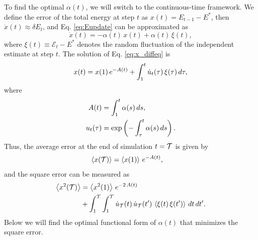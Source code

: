 \documentclass[reprint]{revtex4-1}
\begin{document}
To find the optimal $\alpha(t)$,
we will switch to the continuous-time framework.
%
We define the error of the total energy at step $t$ as
$x(t) = E_{t-1} - E^*$,
then $\dot x(t) \approx \delta E_t$,
and Eq. \eqref{eq:Eupdate} can be approximated as
%
\begin{equation}
  \dot x(t)
  =
  -\alpha(t) \, x(t) + \alpha(t) \, \xi(t)
  ,
  \label{eq:x_diffeq}
\end{equation}
%
where $\xi(t) \equiv \mathcal E_t - E^*$
denotes the random fluctuation of the independent estimate at step $t$.
%
The solution of Eq. \eqref{eq:x_diffeq} is
%
\begin{equation}
  x(t)
  =
  x(1) \, e^{ -A(t) }
  +
  \int_1^t \dot u_t(\tau) \, \xi(\tau) \, d\tau
  ,
  \notag
\end{equation}
%
where
\begin{align*}
  A(t)
  &=
  \int_1^t \alpha(s) \, ds
  ,
\\
  u_t(\tau)
  &= \exp\left(
    -\int_\tau^t \alpha(s) \, ds
  \right)
  .
  \notag
\end{align*}
%
Thus, the average error at the end of simulation $t = \mathcal T$
is given by
%
\begin{align}
  \left\langle
    x(\mathcal T)
  \right\rangle
  &=
  \left\langle
    x(1)
  \right\rangle
  \, e^{ -A(t) }
  ,
  \label{eq:abserr}
\end{align}
%
and the square error
can be measured as
%
\begin{align}
  \left\langle
    x^2(\mathcal T)
  \right\rangle
  &=
  \left\langle
    x^2(1)
  \right\rangle
  \, e^{ -2 \, A(t) }
  \notag \\
  &+
  \int_1^{\mathcal T}
  \int_1^{\mathcal T}
  \dot u_{\mathcal T}(t) \, \dot u_{\mathcal T}(t') \,
  \left\langle
    \xi(t) \, \xi(t')
  \right\rangle
  \, dt \, dt'
  .
  \label{eq:err_functional}
\end{align}
%
Below we will find the optimal functional form of $\alpha(t)$
that minimizes the square error.



\end{document}
